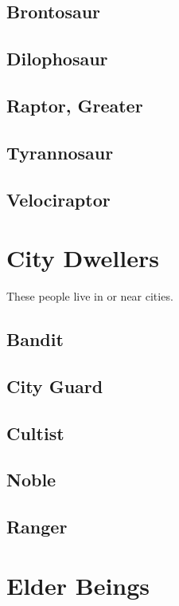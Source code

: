 \begin{multicols}{2}
\subsection{Brontosaur}

\subsection{Dilophosaur}

\subsection{Raptor, Greater}

\subsection{Tyrannosaur}

\subsection{Velociraptor}

\section{City Dwellers}

These people live in or near cities.

\subsection{Bandit}

\subsection{City Guard}

\subsection{Cultist}

\subsection{Noble}

\subsection{Ranger}

\section{Elder Beings}


\end{multicols}
